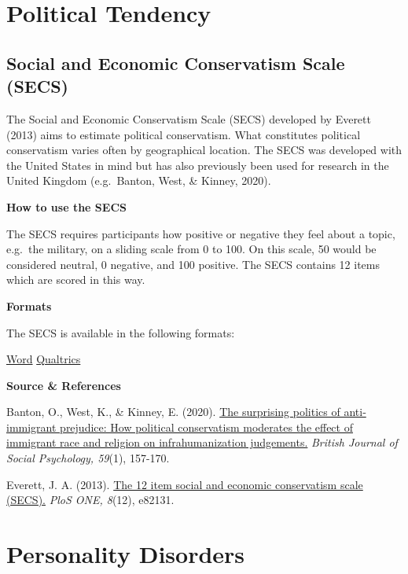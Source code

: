 \documentclass[
]{book}
\begin{document}
\hypertarget{political-tendency}{%
\section{Political Tendency}\label{political-tendency}}

\hypertarget{social-and-economic-conservatism-scale-secs}{%
\subsection{Social and Economic Conservatism Scale (SECS)}\label{social-and-economic-conservatism-scale-secs}}

The Social and Economic Conservatism Scale (SECS) developed by Everett (2013) aims to estimate political conservatism. What constitutes political conservatism varies often by geographical location. The SECS was developed with the United States in mind but has also previously been used for research in the United Kingdom (e.g.~Banton, West, \& Kinney, 2020).

\textbf{How to use the SECS}

The SECS requires participants how positive or negative they feel about a topic, e.g.~the military, on a sliding scale from 0 to 100. On this scale, 50 would be considered neutral, 0 negative, and 100 positive. The SECS contains 12 items which are scored in this way.

\textbf{Formats}

The SECS is available in the following formats:

\href{/questionnaires/SocialandEconomicConservatismScale.docx}{Word} \textbar{} \href{/questionnaires/SocialandEconomicConservatismScale.qsf}{Qualtrics}

\textbf{Source \& References}

Banton, O., West, K., \& Kinney, E. (2020). \href{https://onlinelibrary.wiley.com/doi/pdf/10.1111/bjso.12337}{The surprising politics of anti‐immigrant prejudice: How political conservatism moderates the effect of immigrant race and religion on infrahumanization judgements.} \emph{British Journal of Social Psychology, 59}(1), 157-170.

Everett, J. A. (2013). \href{https://journals.plos.org/plosone/article/file?id=10.1371/journal.pone.0082131\&type=printable}{The 12 item social and economic conservatism scale (SECS).} \emph{PloS ONE, 8}(12), e82131.

\hypertarget{personality-disorders}{%
\section{Personality Disorders}\label{personality-disorders}}
\end{document}
